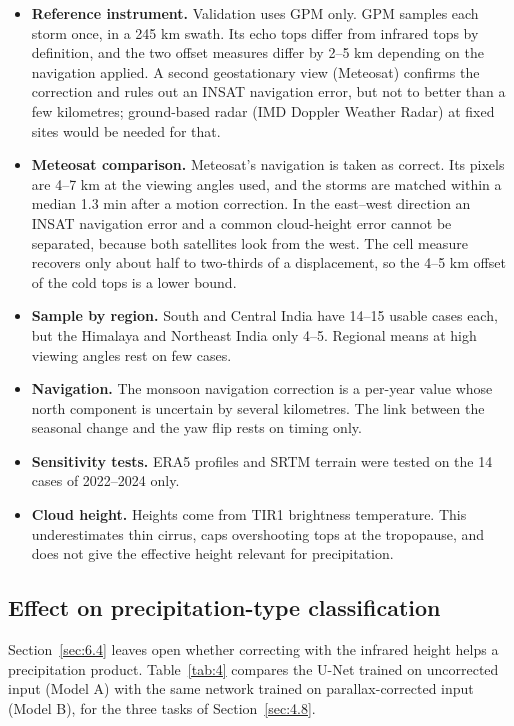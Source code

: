 \begin{itemize}
\tightlist
\item
  \textbf{Reference instrument.} Validation uses GPM only. GPM samples each storm once, in a 245 km swath. Its echo tops differ from infrared tops by definition, and the two offset measures differ by 2--5 km depending on the navigation applied. A second geostationary view (Meteosat) confirms the correction and rules out an INSAT navigation error, but not to better than a few kilometres; ground-based radar (IMD Doppler Weather Radar) at fixed sites would be needed for that.
\item
  \textbf{Meteosat comparison.} Meteosat's navigation is taken as correct. Its pixels are 4--7 km at the viewing angles used, and the storms are matched within a median 1.3 min after a motion correction. In the east--west direction an INSAT navigation error and a common cloud-height error cannot be separated, because both satellites look from the west. The cell measure recovers only about half to two-thirds of a displacement, so the 4--5 km offset of the cold tops is a lower bound.
\item
  \textbf{Sample by region.} South and Central India have 14--15 usable cases each, but the Himalaya and Northeast India only 4--5. Regional means at high viewing angles rest on few cases.
\item
  \textbf{Navigation.} The monsoon navigation correction is a per-year value whose north component is uncertain by several kilometres. The link between the seasonal change and the yaw flip rests on timing only.
\item
  \textbf{Sensitivity tests.} ERA5 profiles and SRTM terrain were tested on the 14 cases of 2022--2024 only.
\item
  \textbf{Cloud height.} Heights come from TIR1 brightness temperature. This underestimates thin cirrus, caps overshooting tops at the tropopause, and does not give the effective height relevant for precipitation.
\end{itemize}

\subsection{Effect on precipitation-type classification}\label{sec:6.8}

Section~\ref{sec:6.4} leaves open whether correcting with the infrared height helps a precipitation product. Table~\ref{tab:4} compares the U-Net trained on uncorrected input (Model A) with the same network trained on parallax-corrected input (Model B), for the three tasks of Section~\ref{sec:4.8}.

